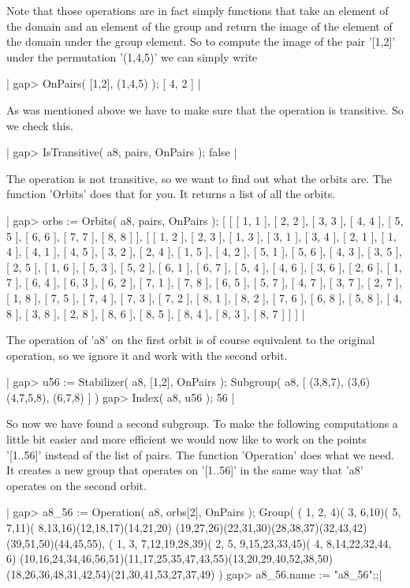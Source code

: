Note  that those operations are in  fact simply functions  that  take  an
element of the domain and an element of the group and return the image of
the element of the domain under  the group element.   So  to  compute the
image of the  pair '[1,2]' under  the permutation '(1,4,5)' we can simply
write

|    gap> OnPairs( [1,2], (1,4,5) );
    [ 4, 2 ] |

As  was  mentioned  above we  have  to  make sure  that the operation  is
transitive.  So we check this.

|    gap> IsTransitive( a8, pairs, OnPairs );
    false |

The operation is not transitive,  so we want to  find out what the orbits
are.  The function 'Orbits' does that for you.  It returns a list  of all
the orbits.

|    gap> orbs := Orbits( a8, pairs, OnPairs );
    [ [ [ 1, 1 ], [ 2, 2 ], [ 3, 3 ], [ 4, 4 ], [ 5, 5 ], [ 6, 6 ],
          [ 7, 7 ], [ 8, 8 ] ],
      [ [ 1, 2 ], [ 2, 3 ], [ 1, 3 ], [ 3, 1 ], [ 3, 4 ], [ 2, 1 ],
          [ 1, 4 ], [ 4, 1 ], [ 4, 5 ], [ 3, 2 ], [ 2, 4 ], [ 1, 5 ],
          [ 4, 2 ], [ 5, 1 ], [ 5, 6 ], [ 4, 3 ], [ 3, 5 ], [ 2, 5 ],
          [ 1, 6 ], [ 5, 3 ], [ 5, 2 ], [ 6, 1 ], [ 6, 7 ], [ 5, 4 ],
          [ 4, 6 ], [ 3, 6 ], [ 2, 6 ], [ 1, 7 ], [ 6, 4 ], [ 6, 3 ],
          [ 6, 2 ], [ 7, 1 ], [ 7, 8 ], [ 6, 5 ], [ 5, 7 ], [ 4, 7 ],
          [ 3, 7 ], [ 2, 7 ], [ 1, 8 ], [ 7, 5 ], [ 7, 4 ], [ 7, 3 ],
          [ 7, 2 ], [ 8, 1 ], [ 8, 2 ], [ 7, 6 ], [ 6, 8 ], [ 5, 8 ],
          [ 4, 8 ], [ 3, 8 ], [ 2, 8 ], [ 8, 6 ], [ 8, 5 ], [ 8, 4 ],
          [ 8, 3 ], [ 8, 7 ] ] ] |

The  operation of 'a8' on the first orbit is of course equivalent to  the
original operation, so we ignore it and work with the second orbit.

|    gap> u56 := Stabilizer( a8, [1,2], OnPairs );
    Subgroup( a8, [ (3,8,7), (3,6)(4,7,5,8), (6,7,8) ] )
    gap> Index( a8, u56 );
    56 |

So  now  we  have  found  a  second  subgroup.   To  make  the  following
computations a  little bit easier and more efficient we would now like to
work on the points '[1..56]' instead of the  list of pairs.  The function
'Operation' does what we need.  It creates a  new group that  operates on
'[1..56]' in the same way that 'a8' operates on the second orbit.

|    gap> a8_56 := Operation( a8, orbs[2], OnPairs );
    Group( ( 1, 2, 4)( 3, 6,10)( 5, 7,11)( 8,13,16)(12,18,17)(14,21,20)
    (19,27,26)(22,31,30)(28,38,37)(32,43,42)(39,51,50)(44,45,55),
    ( 1, 3, 7,12,19,28,39)( 2, 5, 9,15,23,33,45)( 4, 8,14,22,32,44, 6)
    (10,16,24,34,46,56,51)(11,17,25,35,47,43,55)(13,20,29,40,52,38,50)
    (18,26,36,48,31,42,54)(21,30,41,53,27,37,49) )
    gap> a8_56.name := "a8_56";;|

